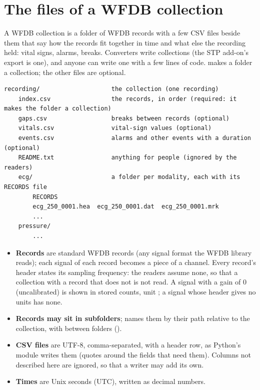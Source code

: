 \section{The files of a WFDB collection}
\label{sec:formats-reference-collection}

A WFDB collection is a folder of WFDB records with a few CSV files beside them that say how the
records fit together in time and what else the recording held: vital signs, alarms, breaks.
Converters write collections (the STP add-on's  export is one), and anyone can write
one with a few lines of code.  makes a folder a collection; the other files are
optional.
\begin{lstlisting}[style=text]
recording/                    the collection (one recording)
    index.csv                 the records, in order (required: it makes the folder a collection)
    gaps.csv                  breaks between records (optional)
    vitals.csv                vital-sign values (optional)
    events.csv                alarms and other events with a duration (optional)
    README.txt                anything for people (ignored by the readers)
    ecg/                      a folder per modality, each with its RECORDS file
        RECORDS
        ecg_250_0001.hea  ecg_250_0001.dat  ecg_250_0001.mrk
        ...
    pressure/
        ...
\end{lstlisting}

\begin{itemize}
\item \textbf{Records} are standard WFDB records (any signal format the WFDB library reads); each
  signal of each record becomes a piece of a channel. Every record's header states its sampling
  frequency: the readers assume none, so that a collection with a record that does not is not
  read. A signal with a gain of 0 (uncalibrated) is shown in stored counts, unit ; a
  signal whose header gives no units has none.
\item \textbf{Records may sit in subfolders};  names them by their path relative
  to the collection, with \code{/} between folders ().
\item \textbf{CSV files} are UTF-8, comma-separated, with a header row, as Python's 
  module writes them (quotes around the fields that need them). Columns not described here are
  ignored, so that a writer may add its own.
\item \textbf{Times} are Unix seconds (UTC), written as decimal numbers.
\end{itemize}

